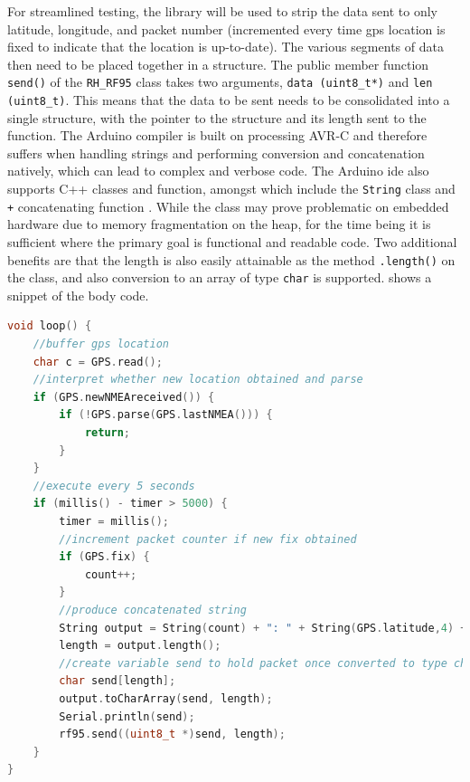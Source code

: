 For streamlined testing, the library will be used to strip the data sent to only latitude, longitude, and packet number
(incremented every time \acrshort{gps} location is fixed to indicate that the location is up-to-date). The various
segments of data then need to be placed together in a structure. The public member function \lstinline{send()} of the
\lstinline{RH_RF95} class \cite{airspayce:docs} takes two arguments, \lstinline{data (uint8_t*)} and \lstinline{len (uint8_t)}.
This means that the data to be sent needs to be consolidated into a single structure, with the pointer to the structure
and its length sent to the function. The Arduino compiler is built on processing AVR-C and therefore suffers when handling
strings and performing conversion and concatenation natively, which can lead to complex and verbose code.
The Arduino \acrshort{ide} also supports C++ classes and function, amongst which
include the \lstinline{String} class and \lstinline{+} concatenating function
\cite{arduino:introduction, arduino:reference}. While the class may prove problematic on embedded hardware
due to memory fragmentation on the heap, for the time being it is sufficient where the primary goal is
functional and readable code. Two additional benefits are that the length is also easily attainable
as the method \lstinline{.length()} on the class, and also conversion to an array of type \lstinline{char} is supported.
 shows a snippet of the body code.

\begin{lstlisting}[language=C++,label=code:transmissionbody,caption={Transmission body code},captionpos=b]
void loop() {
    //buffer gps location
    char c = GPS.read();           
    //interpret whether new location obtained and parse
    if (GPS.newNMEAreceived()) {    
        if (!GPS.parse(GPS.lastNMEA())) { 
            return;
        }
    }
    //execute every 5 seconds
    if (millis() - timer > 5000) {  
        timer = millis(); 
        //increment packet counter if new fix obtained
        if (GPS.fix) {
            count++;                
        }
        //produce concatenated string
        String output = String(count) + ": " + String(GPS.latitude,4) + "," + String(GPS.longitude,4);      
        length = output.length();
        //create variable send to hold packet once converted to type char
        char send[length];          
        output.toCharArray(send, length);
        Serial.println(send);   
        rf95.send((uint8_t *)send, length);        
    }
}
\end{lstlisting}

